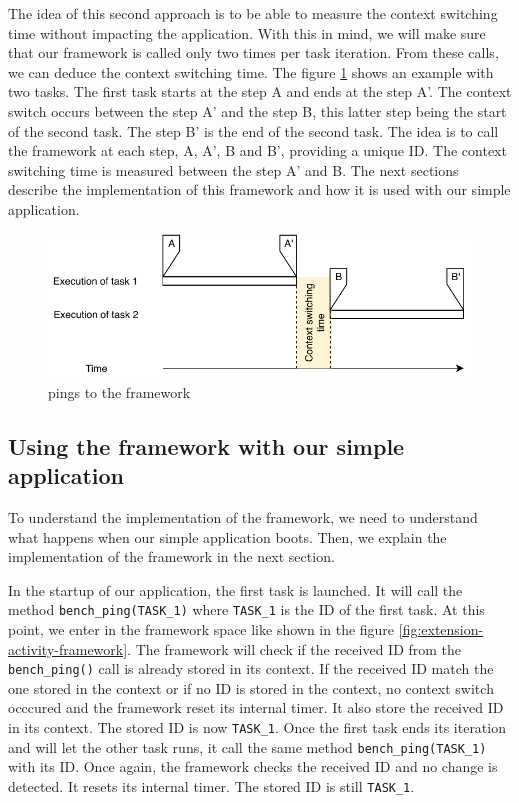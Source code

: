 The idea of this second approach is to be able to measure the context switching time without impacting the application.
With this in mind, we will make sure that our framework is called only two times per task iteration.
From these calls, we can deduce the context switching time.
The figure \ref{fig:internal-framework-ping} shows an example with two tasks.
The first task starts at the step A and ends at the step A'.
The context switch occurs between the step A' and the step B, this latter step being the start of the second task.
The step B' is the end of the second task.
The idea is to call the framework at each step, A, A', B and B', providing a unique ID.
The context switching time is measured between the step A' and B.
The next sections describe the implementation of this framework and how it is used with our simple application.

\begin{figure}[!ht]
  \centering
  \includegraphics[scale=1]{assets/internal-framework-ping.pdf}
  \caption{\label{fig:internal-framework-ping}pings to the framework}
\end{figure}

\subsection{Using the framework with our simple application}

To understand the implementation of the framework, we need to understand what happens when our simple application boots. 
Then, we explain the implementation of the framework in the next section.

In the startup of our application, the first task is launched.
It will call the method \texttt{bench\_ping(TASK\_1)} where \texttt{TASK\_1} is the ID of the first task.
At this point, we enter in the framework space like shown in the figure \ref{fig:extension-activity-framework}.
The framework will check if the received ID from the \texttt{bench\_ping()} call is already stored in its context.
If the received ID match the one stored in the context or if no ID is stored in the context, no context switch occcured and the framework reset its internal timer.
It also store the received ID in its context.
The stored ID is now \texttt{TASK\_1}.
Once the first task ends its iteration and will let the other task runs, it call the same method \texttt{bench\_ping(TASK\_1)} with its ID.
Once again, the framework checks the received ID and no change is detected.
It resets its internal timer.
The stored ID is still \texttt{TASK\_1}.


